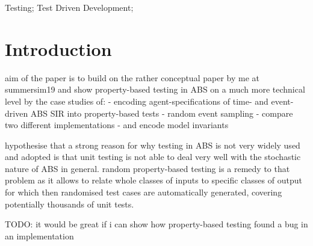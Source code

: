 \documentclass[]{interact}
\theoremstyle{plain}%
\theoremstyle{definition}
\theoremstyle{remark}
\begin{document}
\begin{keywords}
Testing; Test Driven Development;
\end{keywords}









\section{Introduction}
 aim of the paper is to build on the rather conceptual paper by me at summersim19 and show property-based testing in ABS on a much more technical level by the case studies of:
	- encoding agent-specifications of time- and event-driven ABS SIR into property-based tests
	- random event sampling
	- compare two different implementations
 	- and encode model invariants 
 	
hypothesise that a strong reason for why testing in ABS is not very widely used and adopted is that unit testing is not able to deal very well with the stochastic nature of ABS in general. random property-based testing is a remedy to that problem as it allows to relate whole classes of inputs to specific classes of output for which then randomised test cases are automatically generated, covering potentially thousands of unit tests.

TODO: it would be great if i can show how property-based testing found a bug in an implementation
\end{document}
